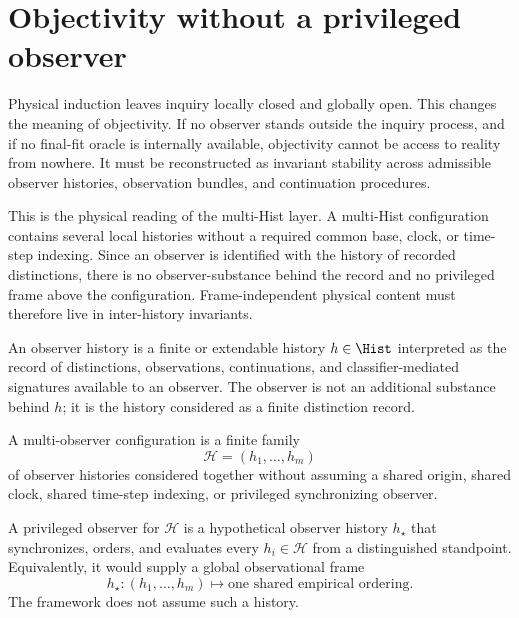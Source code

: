 \section{Objectivity without a privileged observer}
\label{sec:objectivity-without-privileged-observer}

Physical induction leaves inquiry locally closed and globally open. This changes the meaning of objectivity. If no observer stands outside the inquiry process, and if no final-fit oracle is internally available, objectivity cannot be access to reality from nowhere. It must be reconstructed as invariant stability across admissible observer histories, observation bundles, and continuation procedures.

This is the physical reading of the multi-Hist layer. A multi-Hist configuration contains several local histories without a required common base, clock, or time-step indexing. Since an observer is identified with the history of recorded distinctions, there is no observer-substance behind the record and no privileged frame above the configuration. Frame-independent physical content must therefore live in inter-history invariants.

\begin{definition}
\label{def:reality-observer-history}
An observer history is a finite or extendable history $h\in\Hist$ interpreted as the record of distinctions, observations, continuations, and classifier-mediated signatures available to an observer. The observer is not an additional substance behind $h$; it is the history considered as a finite distinction record.
\end{definition}

\begin{definition}
\label{def:reality-multi-observer-configuration}
A multi-observer configuration is a finite family
$$
\mathcal H=(h_1,\ldots,h_m)
$$
of observer histories considered together without assuming a shared origin, shared clock, shared time-step indexing, or privileged synchronizing observer.
\end{definition}

\begin{definition}
\label{def:reality-privileged-observer}
A privileged observer for $\mathcal H$ is a hypothetical observer history $h_\star$ that synchronizes, orders, and evaluates every $h_i\in\mathcal H$ from a distinguished standpoint. Equivalently, it would supply a global observational frame
$$
h_\star:(h_1,\ldots,h_m)
\longmapsto
\text{one shared empirical ordering}.
$$
The framework does not assume such a history.
\end{definition}

